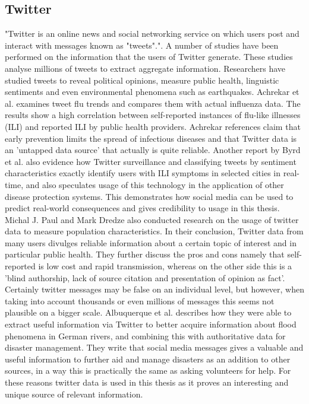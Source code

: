   

\subsection{Twitter}
"Twitter is an online news and social networking service on which users post and interact with messages known as "tweets"."\cite{twitter_twitter}. A number of studies have been performed on the information that the users of Twitter generate. These studies analyse millions of tweets to extract aggregate information. Researchers have studied tweets to reveal political opinions\cite{twitter_politic}, measure public health\cite{twitter_flu_trends}, linguistic sentiments\cite{twitter_linguistics} and even environmental phenomena such as earthquakes\cite{twitter_earthQuake}. Achrekar et al.\cite{twitter_flu_trends} examines tweet flu trends and compares them with actual influenza data. The results show a high correlation between self-reported instances of flu-like illnesses (ILI) and reported ILI by public health providers. Achrekar references claim that early prevention limits the spread of infectious diseases and that Twitter data is an 'untapped data source' that actually is quite reliable. Another report by Byrd et al.\cite{byrd2016mining} also evidence how Twitter surveillance and classifying tweets by sentiment characteristics exactly identify users with ILI symptoms in selected cities in real-time, and also speculates usage of this technology in the application of other disease protection systems. This demonstrates how social media can be used to predict real-world consequences and gives credibility to usage in this thesis. \\Michal J. Paul and Mark Dredze \cite{twitter_what_you_tweet} also conducted research on the usage of twitter data to measure population characteristics. In their conclusion, Twitter data from many users divulges reliable information about a certain topic of interest and in particular public health. They further discuss the pros and cons namely that self-reported is low cost and rapid transmission, whereas on the other side this is a 'blind authorship, lack of source citation and presentation of opinion as fact'. Certainly twitter messages may be false on an individual level, but however, when taking into account thousands or even millions of messages this seems not plausible on a bigger scale. Albuquerque et al. \cite{de2015geographic} describes how they were able to extract useful information via Twitter to better acquire information about flood phenomena in German rivers, and combining this with authoritative data for disaster management. They write that social media messages gives a valuable and useful information to further aid and manage disasters as an addition to other sources, in a way this is practically the same as asking volunteers for help. For these reasons twitter data is used in this thesis as it proves an interesting and unique source of relevant information.





